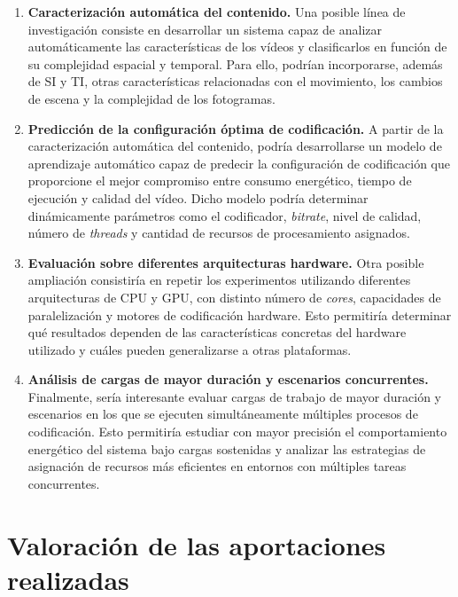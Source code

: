 \begin{enumerate}

 \item \textbf{Caracterización automática del contenido.} Una posible línea de investigación consiste en desarrollar un sistema capaz de analizar automáticamente las características de los vídeos y clasificarlos en función de su complejidad espacial y temporal. Para ello, podrían incorporarse, además de SI y TI, otras características relacionadas con el movimiento, los cambios de escena y la complejidad de los fotogramas.

 

 \item \textbf{Predicción de la configuración óptima de codificación.} A partir de la caracterización automática del contenido, podría desarrollarse un modelo de aprendizaje automático capaz de predecir la configuración de codificación que proporcione el mejor compromiso entre consumo energético, tiempo de ejecución y calidad del vídeo. Dicho modelo podría determinar dinámicamente parámetros como el codificador, \textit{bitrate}, nivel de calidad, número de \textit{threads} y cantidad de recursos de procesamiento asignados.

 

 \item \textbf{Evaluación sobre diferentes arquitecturas hardware.} Otra posible ampliación consistiría en repetir los experimentos utilizando diferentes arquitecturas de CPU y GPU, con distinto número de \textit{cores}, capacidades de paralelización y motores de codificación hardware. Esto permitiría determinar qué resultados dependen de las características concretas del hardware utilizado y cuáles pueden generalizarse a otras plataformas.

 

 \item \textbf{Análisis de cargas de mayor duración y escenarios concurrentes.} Finalmente, sería interesante evaluar cargas de trabajo de mayor duración y escenarios en los que se ejecuten simultáneamente múltiples procesos de codificación. Esto permitiría estudiar con mayor precisión el comportamiento energético del sistema bajo cargas sostenidas y analizar las estrategias de asignación de recursos más eficientes en entornos con múltiples tareas concurrentes.

\end{enumerate}

\section{Valoración de las aportaciones realizadas}

